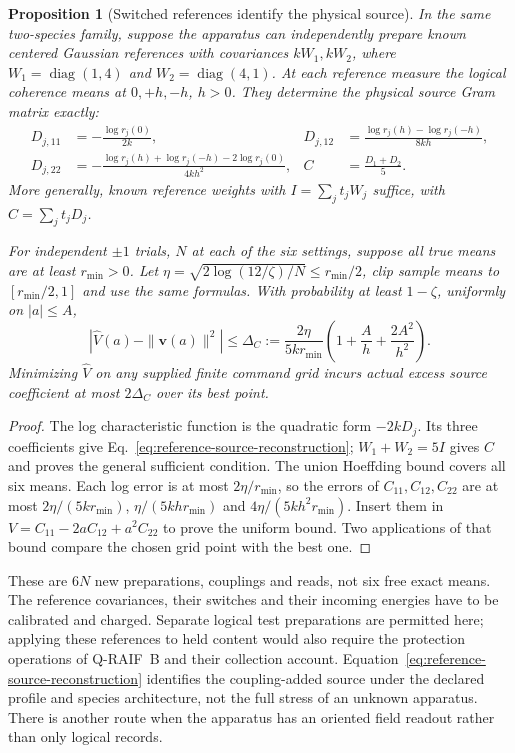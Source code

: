 \documentclass[12pt,a4paper]{article}
\newtheorem{proposition}[theorem]{Proposition}
\begin{document}
\begin{proposition}[Switched references identify the physical source]
\label{prop:reference-source-identification}
In the same two-species family, suppose the apparatus can independently
prepare known centered Gaussian references with covariances $kW_1,kW_2$,
where $W_1=\operatorname{diag}(1,4)$ and
$W_2=\operatorname{diag}(4,1)$. At each reference measure the logical
coherence means at $0,+h,-h$, $h>0$. They determine the physical source
Gram matrix exactly:
\begin{align}
 D_{j,11}&=-\frac{\log r_j(0)}{2k},&
 D_{j,12}&=\frac{\log r_j(h)-\log r_j(-h)}{8kh},\nonumber\\
 D_{j,22}&=-\frac{\log r_j(h)+\log r_j(-h)-2\log r_j(0)}{4kh^2},&
 C&=\frac{D_1+D_2}{5}.
 \label{eq:reference-source-reconstruction}
\end{align}
More generally, known reference weights with
$I=\sum_jt_jW_j$ suffice, with $C=\sum_jt_jD_j$.

For independent $\pm1$ trials, $N$ at each of the six settings, suppose
all true means are at least $r_{\min}>0$. Let
$\eta=\sqrt{2\log(12/\zeta)/N}\le r_{\min}/2$, clip sample means to
$[r_{\min}/2,1]$ and use the same formulas. With probability at least
$1-\zeta$, uniformly on $|a|\le A$,
\begin{equation}
 |\widehat V(a)-\|\mathbf v(a)\|^2|
 \le\Delta_C:=\frac{2\eta}{5kr_{\min}}
            \left(1+\frac A h+\frac{2A^2}{h^2}\right).
 \label{eq:reference-source-error}
\end{equation}
Minimizing $\widehat V$ on any supplied finite command grid incurs
actual excess source coefficient at most $2\Delta_C$ over its best point.
\end{proposition}
\begin{proof}
The log characteristic function is the quadratic form $-2kD_j$.
Its three coefficients give Eq.~\eqref{eq:reference-source-reconstruction};
$W_1+W_2=5I$ gives $C$ and proves the general sufficient condition.
The union Hoeffding bound covers all six means. Each log error is at most
$2\eta/r_{\min}$, so the errors of $C_{11},C_{12},C_{22}$ are at most
$2\eta/(5kr_{\min})$, $\eta/(5khr_{\min})$ and
$4\eta/(5kh^2r_{\min})$. Insert them in
$V=C_{11}-2aC_{12}+a^2C_{22}$ to prove the uniform bound.
Two applications of that bound compare the chosen grid point with the best one.
\end{proof}

These are $6N$ new preparations, couplings and reads, not six free exact
means. The reference covariances, their switches and their incoming energies
have to be calibrated and charged. Separate logical test preparations are
permitted here; applying these references to held content would also require
the protection operations of Q-RAIF~B and their collection account.
Equation~\eqref{eq:reference-source-reconstruction} identifies the
coupling-added source under the declared profile and species architecture,
not the full stress of an unknown apparatus. There is another route when
the apparatus has an oriented field readout rather than only logical records.
\end{document}
